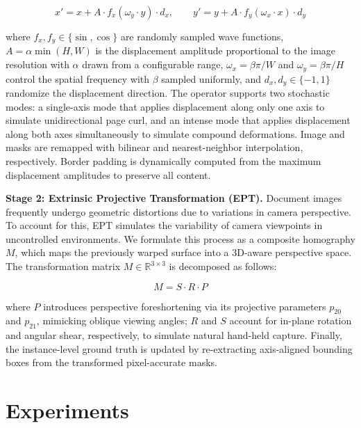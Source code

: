 \documentclass[11pt, a4paper,logo,  copyright, nonumbering]{paddleocr}
\begin{document}
\begin{equation}
    x' = x + A \cdot f_x\!\left(\omega_y \cdot y\right) \cdot d_x, \qquad
    y' = y + A \cdot f_y\!\left(\omega_x \cdot x\right) \cdot d_y
\end{equation}

where $f_x, f_y \in \{\sin, \cos\}$ are randomly sampled wave functions, $A = \alpha \min(H, W)$ is the displacement amplitude proportional to the image resolution with $\alpha$ drawn from a configurable range, $\omega_x = \beta\pi / W$ and $\omega_y = \beta\pi / H$ control the spatial frequency with $\beta$ sampled uniformly, and $d_x, d_y \in \{-1, 1\}$ randomize the displacement direction. The operator supports two stochastic modes: a single-axis mode that applies displacement along only one axis to simulate unidirectional page curl, and an intense mode that applies displacement along both axes simultaneously to simulate compound deformations. Image and masks are remapped with bilinear and nearest-neighbor interpolation, respectively. Border padding is dynamically computed from the maximum displacement amplitudes to preserve all content.

\textbf{Stage 2: Extrinsic Projective Transformation (EPT).}
Document images frequently undergo geometric distortions due to variations in camera perspective. To account for this, EPT simulates the variability of camera viewpoints in uncontrolled environments. We formulate this process as a composite homography $M$, which maps the previously warped surface into a 3D-aware perspective space. The transformation matrix $M \in \mathbb{R}^{3 \times 3}$ is decomposed as follows:

\begin{equation}
    M = S \cdot R \cdot P
\end{equation}

where $P$ introduces perspective foreshortening via its projective parameters $p_{20}$ and $p_{21}$, mimicking oblique viewing angles; $R$ and $S$ account for in-plane rotation and angular shear, respectively, to simulate natural hand-held capture. Finally, the instance-level ground truth is updated by re-extracting axis-aligned bounding boxes from the transformed pixel-accurate masks.

\section{Experiments}
\label{sec:experiments}
\end{document}

